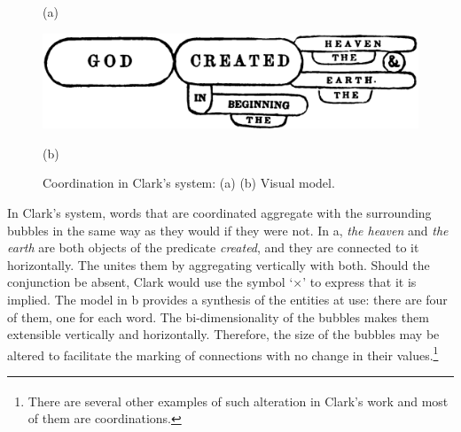 \documentclass[english,output=paper,colorlinks,citecolor=brown]{../langscibook}
\begin{document}
\begin{figure}
    (a) \hspace{1em} \begin{minipage}[c]{.45\textwidth}\includegraphics[width=\textwidth]{figures/04/Clark2.png}\end{minipage}\hfill
    (b) \hspace{1em} 
    \caption{Coordination in Clark’s system: (a) \citet[24]{Clark1847} (b) Visual model.\label{fig:4:7}}    
\end{figure}
 



In Clark’s system, words that are coordinated aggregate with the surrounding bubbles in the same way as they would if they were not. In a, \textit{the heaven} and \textit{the earth} are both objects of the predicate \textit{created}, and they are connected to it horizontally. The  unites them by aggregating vertically with both. Should the conjunction be absent, Clark would use the symbol ‘×’ to express that it is implied. The model in b provides a synthesis of the entities at use: there are four of them, one for each word. The bi-dimensionality of the bubbles makes them extensible vertically and horizontally. Therefore, the size of the bubbles may be altered to facilitate the marking of connections with no change in their values.\footnote{\textrm{\textsuperscript{} }\textrm{There are several other examples of such alteration in Clark’s work and most of them are coordinations.} } 
\end{document}
